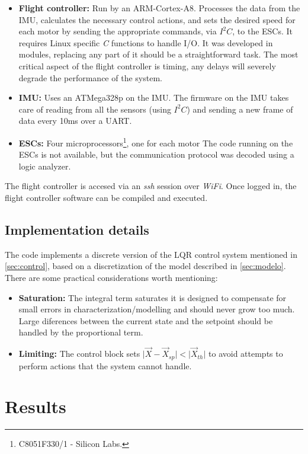 \documentclass[conference]{IEEEtran}
\begin{document}
\begin{itemize}
\item \textbf{Flight controller:} Run by an ARM-Cortex-A8. Processes the data from the IMU, calculates the necessary control actions, and sets the desired speed for each motor by sending the appropriate commands, via $I^2C$, to the ESCs. It requires Linux specific \textit{C} functions to handle I/O. It was developed in modules, replacing any part of it should be a straightforward task. The most critical aspect of the flight controller is timing, any delays will severely degrade the performance of the system.
\item \textbf{IMU:} Uses an ATMega328p on the IMU. The firmware on the IMU takes care of reading from all the sensors (using $I^2C$) and sending a new frame of data every 10ms over a UART.
\item \textbf{ESCs:} Four microprocessors\footnote{C8051F330/1 - Silicon Labs.}, one for each motor The code running on the ESCs is not available, but the communication protocol was decoded using a logic analyzer.
\end{itemize}

The flight controller is accesed via an \textit{ssh} session over \textit{WiFi}. Once logged in, the flight controller software can be compiled and executed.

\subsection{Implementation details}
\label{sec:software-impl}

The code implements a discrete version of the LQR control system mentioned in \ref{sec:control}, based on a discretization of the model described in \ref{sec:modelo}. There are some practical considerations worth mentioning:
\begin{itemize}
\item \textbf{Saturation:} The integral term saturates it is designed to compensate for small errors in characterization/modelling and should never grow too much. Large diferences between the current state and the setpoint should be handled by the proportional term.
\item \textbf{Limiting:} The control block sets $\vert \vec{X} - \vec{X}_{sp}\vert < \vert \vec{X}_{th} \vert$ to avoid attempts to perform actions that the system cannot handle.
\end{itemize}


\section{Results}
\end{document}
